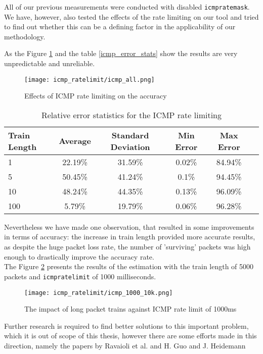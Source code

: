 All of our previous measurements were conducted with disabled \texttt{icmp\textunderscore ratemask}. We have, however, also tested the effects of the rate limiting on our tool and tried to find out whether this can be a defining factor in the applicability of our methodology. 

As the Figure \ref{icmp_all} and the table \ref{icmp_error_stats} show the results are very unpredictable and unreliable.

\begin{figure}[H]
 \centering
 \texttt{[image: icmp\_ratelimit/icmp\_all.png]}
 \caption{Effects of ICMP rate limiting on the accuracy}
 \label{icmp_all}
\end{figure}


\begin{table}[h!]
  \centering
  \caption{Relative error statistics for the ICMP rate limiting}
  \label{icmp_error_stats}
\begin{tabular}{l|c|c|c|c|c}
\toprule
 Train Length & Average & Standard Deviation & Min Error & Max Error \\ \midrule
  \label{}
	1 & 22.19\% & 31.59\% & 0.02\% & 84.94\% \\
	5 & 50.45\% & 41.24\% & 0.1\% & 94.45\% \\
	10 & 48.24\% & 44.35\% & 0.13\% & 96.09\% \\
	100 & 5.79\% & 19.79\% & 0.06\% & 96.28\% \\ \bottomrule
  \end{tabular}      
\end{table}

Nevertheless we have made one observation, that resulted in some improvements in terms of accuracy: the increase in train length provided more accurate results, as despite the huge packet loss rate, the number of 'surviving' packets was high enough to drastically improve the accuracy rate. \\
The Figure \ref{icmp_1000} presents the results of the estimation with the train length of 5000 packets and \texttt{icmp\textunderscore ratelimit} of 1000 milliseconds.

\begin{figure}[H]
 \centering
 \texttt{[image: icmp\_ratelimit/icmp\_1000\_10k.png]}
 \caption{The impact of long packet trains against ICMP rate limit of 1000ms}
 \label{icmp_1000}
\end{figure}


Further research is required to find better solutions to this important problem, which it is out of scope of this thesis, however there are some efforts made in this direction, namely the papers by Ravaioli et al. \cite{RaUrBa_icmp} and H. Guo and J. Heidemann\cite{fader2017}

